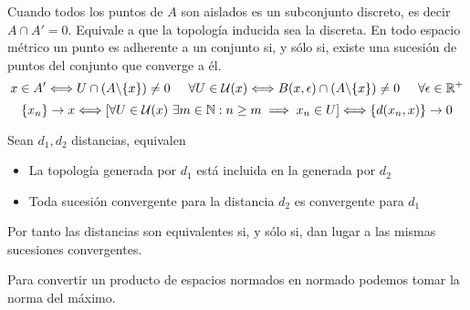 Cuando todos los puntos de $A$ son aislados es un subconjunto discreto, es decir $A\cap A'=0$. Equivale a que la topología inducida sea la discreta.
En todo espacio métrico un punto es adherente a un conjunto si, y sólo si, existe una sucesión de puntos del conjunto que converge a él. 
$$ x\in A' \Longleftrightarrow 
U\cap (A\backslash\{x\}) \not=0 \hspace{0.5cm} \forall U\in\mathcal{U}(x)\Longleftrightarrow
B(x,\epsilon) \cap (A\backslash\{x\}) \not =0\hspace{0.5cm} \forall\epsilon\in\mathbb{R}^+ $$
$$ \{x_n\}\rightarrow x \Longleftrightarrow [\forall U\in\mathcal{U}(x) \ \exists m\in\mathbb{N} : n\geq m\implies x_n\in U] \Longleftrightarrow \{d(x_n,x)\}\rightarrow 0$$

Sean $d_1,d_2$ distancias, equivalen
\begin{itemize}
	\item La topología generada por $d_1$ está incluida en la generada por $d_2$
	\item Toda sucesión convergente para la distancia $d_2$ es convergente para $d_1$
\end{itemize}
Por tanto las distancias son equivalentes si, y sólo si, dan lugar a las mismas sucesiones convergentes.




Para convertir un producto de espacios normados en normado podemos tomar la norma del máximo.
